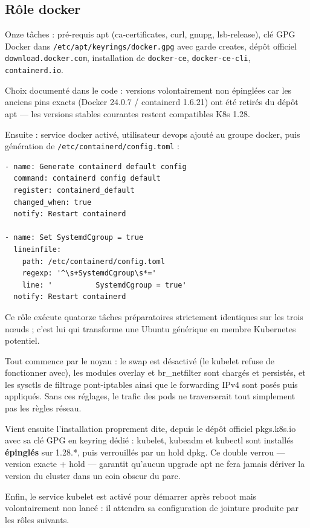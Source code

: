 \documentclass[12pt,a4paper]{article}
\begin{document}
\subsection{Rôle docker}
Onze tâches : pré-requis apt (ca-certificates, curl, gnupg, lsb-release), clé GPG Docker dans \texttt{/etc/apt/keyrings/docker.gpg} avec garde creates, dépôt officiel \texttt{download.docker.com}, installation de \texttt{docker-ce}, \texttt{docker-ce-cli}, \texttt{containerd.io}.

Choix documenté dans le code : versions volontairement non épinglées car les anciens pins exacts (Docker 24.0.7 / containerd 1.6.21) ont été retirés du dépôt apt --- les versions stables courantes restent compatibles K8s 1.28.

Ensuite : service docker activé, utilisateur devops ajouté au groupe docker, puis génération de \texttt{/etc/containerd/config.toml} :

\begin{lstlisting}[caption={Bascule cruciale : pilote cgroup systemd pour containerd}]
- name: Generate containerd default config
  command: containerd config default
  register: containerd_default
  changed_when: true
  notify: Restart containerd

- name: Set SystemdCgroup = true
  lineinfile:
    path: /etc/containerd/config.toml
    regexp: '^\s+SystemdCgroup\s*='
    line: '          SystemdCgroup = true'
  notify: Restart containerd
\end{lstlisting}

Ce rôle exécute quatorze tâches préparatoires strictement identiques sur les trois nœuds ; c'est lui qui transforme une Ubuntu générique en membre Kubernetes potentiel.

Tout commence par le noyau : le swap est désactivé (le kubelet refuse de fonctionner avec), les modules overlay et br\_netfilter sont chargés et persistés, et les sysctls de filtrage pont-iptables ainsi que le forwarding IPv4 sont posés puis appliqués. Sans ces réglages, le trafic des pods ne traverserait tout simplement pas les règles réseau.

Vient ensuite l'installation proprement dite, depuis le dépôt officiel pkgs.k8s.io avec sa clé GPG en keyring dédié : kubelet, kubeadm et kubectl sont installés \textbf{épinglés} sur 1.28.*, puis verrouillés par un hold dpkg. Ce double verrou --- version exacte + hold --- garantit qu'aucun upgrade apt ne fera jamais dériver la version du cluster dans un coin obscur du parc.

Enfin, le service kubelet est activé pour démarrer après reboot mais volontairement non lancé : il attendra sa configuration de jointure produite par les rôles suivants.
\end{document}
